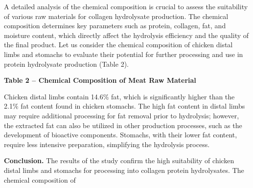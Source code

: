 A detailed analysis of the chemical composition is crucial to assess the
suitability of various raw materials for collagen hydrolysate
production. The chemical composition determines key parameters such as
protein, collagen, fat, and moisture content, which directly affect the
hydrolysis efficiency and the quality of the final product. Let us
consider the chemical composition of chicken distal limbs and stomachs
to evaluate their potential for further processing and use in protein
hydrolysate production (Table 2).

{\bfseries Table 2 -- Chemical Composition of Meat Raw Material}


Chicken distal limbs contain 14.6\% fat, which is significantly higher
than the 2.1\% fat content found in chicken stomachs. The high fat
content in distal limbs may require additional processing for fat
removal prior to hydrolysis; however, the extracted fat can also be
utilized in other production processes, such as the development of
bioactive components. Stomachs, with their lower fat content, require
less intensive preparation, simplifying the hydrolysis process.

{\bfseries Conclusion.} The results of the study confirm the high
suitability of chicken distal limbs and stomachs for processing into
collagen protein hydrolysates. The chemical composition of

